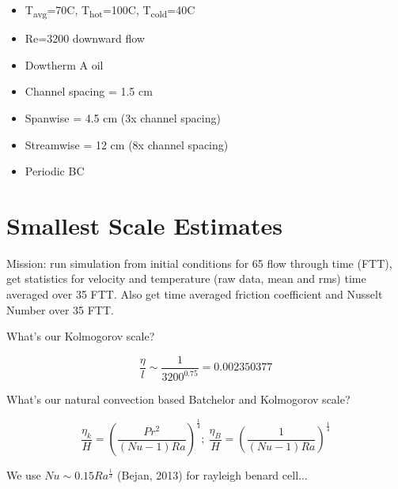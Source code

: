 \documentclass[12pt]{article}
\renewcommand{\_}{\kern-1.5pt\textunderscore\kern-1.5pt}
\begin{document}
\begin{itemize}
	\item T\textsubscript{avg}=70C, T\textsubscript{hot}=100C, T\textsubscript{cold}=40C\par

	\item Re=3200 downward flow\par

	\item Dowtherm A oil\par

	\item Channel spacing = 1.5 cm\par

	\item Spanwise = 4.5 cm (3x channel spacing)\par

	\item Streamwise = 12 cm (8x channel spacing)\par

	\item Periodic BC\par
\end{itemize}

\section{Smallest Scale Estimates}
\vspace{\baselineskip}
Mission: run simulation from initial conditions for 65 flow through time (FTT), get statistics for velocity and temperature (raw data, mean and rms) time averaged over 35 FTT. Also get time averaged friction coefficient and Nusselt Number over 35 FTT.\par

What’s our Kolmogorov scale?\par

 \[ \frac{ \eta }{l} \sim \frac{1}{3200^{0.75}}=0.002350377 \] \par

What’s our natural convection based Batchelor and Kolmogorov scale?\par

 \[ \frac{ \eta _{k}}{H}= \left( \frac{Pr^{2}}{ \left( Nu-1 \right) Ra} \right) ^{\frac{1}{4}};~\frac{ \eta _{B}}{H}= \left( \frac{1}{ \left( Nu-1 \right) Ra} \right) ^{\frac{1}{4}} \] \par

We use  \( Nu \sim 0.15Ra^{\frac{1}{3}} \)  (Bejan, 2013) for rayleigh benard cell$ \ldots $  \par
\end{document}
